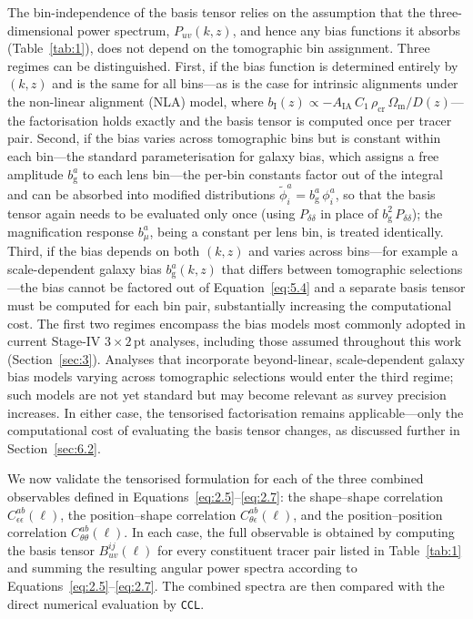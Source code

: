 The bin-independence of the basis tensor relies on the assumption that the three-dimensional power spectrum, \(P_{uv}(k,z)\), and hence any bias functions it absorbs (Table~\ref{tab:1}), does not depend on the tomographic bin assignment. Three regimes can be distinguished. First, if the bias function is determined entirely by \((k,z)\) and is the same for all bins---as is the case for intrinsic alignments under the non-linear alignment (NLA) model, where \(b_\mathrm{I}(z) \propto -A_\mathrm{IA}\,C_1\,\rho_\mathrm{cr}\,\Omega_\mathrm{m}/D(z)\)---the factorisation holds exactly and the basis tensor is computed once per tracer pair. Second, if the bias varies across tomographic bins but is constant within each bin---the standard parameterisation for galaxy bias, which assigns a free amplitude \(b_\mathrm{g}^{a}\) to each lens bin---the per-bin constants factor out of the integral and can be absorbed into modified distributions \(\tilde{\phi}^{a}_{i} = b_\mathrm{g}^{a}\,\phi^{a}_{i}\), so that the basis tensor again needs to be evaluated only once (using \(P_{\delta\delta}\) in place of \(b_\mathrm{g}^{2}\,P_{\delta\delta}\)); the magnification response \(b_\mu^{a}\), being a constant per lens bin, is treated identically. Third, if the bias depends on both \((k,z)\) and varies across bins---for example a scale-dependent galaxy bias \(b_\mathrm{g}^{a}(k,z)\) that differs between tomographic selections---the bias cannot be factored out of Equation~\ref{eq:5.4} and a separate basis tensor must be computed for each bin pair, substantially increasing the computational cost. The first two regimes encompass the bias models most commonly adopted in current Stage-IV \(3\times2\,\mathrm{pt}\) analyses, including those assumed throughout this work (Section~\ref{sec:3}). Analyses that incorporate beyond-linear, scale-dependent galaxy bias models varying across tomographic selections would enter the third regime; such models are not yet standard but may become relevant as survey precision increases. In either case, the tensorised factorisation remains applicable---only the computational cost of evaluating the basis tensor changes, as discussed further in Section~\ref{sec:6.2}.

We now validate the tensorised formulation for each of the three combined observables defined in Equations~\ref{eq:2.5}--\ref{eq:2.7}: the shape--shape correlation \(C_{\epsilon\epsilon}^{ab}(\ell)\), the position--shape correlation \(C_{\theta\epsilon}^{ab}(\ell)\), and the position--position correlation \(C_{\theta\theta}^{ab}(\ell)\). In each case, the full observable is obtained by computing the basis tensor \(B_{uv}^{ij}(\ell)\) for every constituent tracer pair listed in Table~\ref{tab:1} and summing the resulting angular power spectra according to Equations~\ref{eq:2.5}--\ref{eq:2.7}. The combined spectra are then compared with the direct numerical evaluation by \texttt{CCL}.

